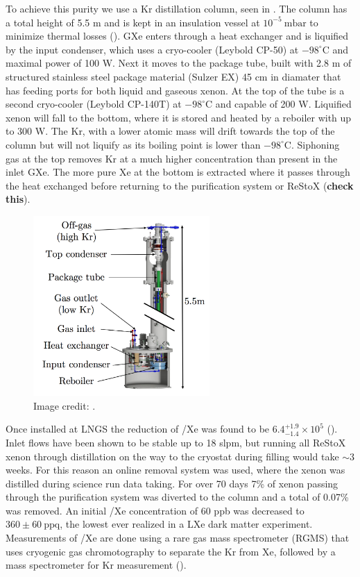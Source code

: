 To achieve this purity we use a Kr distillation column, seen in .  The column has a total
height of 5.5 m and is kept in an insulation vessel at $10^{-5}\ \mathrm{mbar}$ to minimize thermal losses ().  GXe
enters through a heat exchanger and is
liquified by the input condenser, which uses a cryo-cooler (Leybold CP-50) at $-98^{\circ}\mathrm{C}$ and maximal power
of 100 W.  Next it moves to the package tube, built with 2.8 m of structured stainless steel package material (Sulzer EX) 45 cm in
diamater that has feeding ports for both liquid and gaseous xenon.  At the top of the tube is a second cryo-cooler (Leybold CP-140T)
at $-98^{\circ}\mathrm{C}$ and capable of 200 W.  Liquified xenon will fall to the bottom, where it is stored and heated by a
reboiler with up to 300 W.  The Kr, with a lower atomic mass will drift towards the top of the column but will not liquify as its
boiling point is lower than $-98^{\circ}\mathrm{C}$.  Siphoning gas at the top removes Kr at a much higher concentration than
present in the inlet GXe.  The more pure Xe at the bottom is extracted where it passes through the heat exchanged before returning to the
purification system or ReStoX (\textbf{check this}).

\begin{figure}
\centering
\includegraphics[width=0.6\textwidth]{KrColumn}
\caption{Image credit: .}
\label{fig:xeno1t_kr_dist_column}
\end{figure}

Once installed at LNGS the reduction of /Xe was found to be $6.4_{-1.4}^{+1.9} \times 10^{5}$
().  Inlet flows have been shown to be stable up to 18 slpm, but running all ReStoX xenon through distillation on the
way to the cryostat during filling would take ${\sim}3$ weeks.  For this reason an online removal system was used, where the xenon was
distilled during
science run data taking.  For over 70 days 7\% of xenon passing through the purification system was diverted to the column and a total
of 0.07\% was
removed.  An initial /Xe concentration of 60 ppb was decreased to $360 \pm 60\ \mathrm{ppq}$, the lowest ever realized in a
LXe dark matter experiment.  Measurements of /Xe are done using a rare gas mass spectrometer (RGMS) that uses cryogenic gas
chromotography to separate the Kr from Xe, followed by a mass spectrometer for Kr measurement ().

